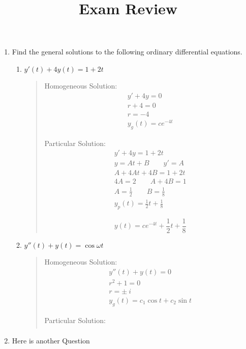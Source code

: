 \documentclass{article}
\title{Exam Review}
\date{}
\newcommand{\beq}{\begin{quote}}
\newcommand{\eeq}{\end{quote}}
\begin{document}
\maketitle
\begin{enumerate}
\item Find the general solutions to the following ordinary differential equations.
\begin{enumerate}
\item $y'(t) + 4y(t) = 1 + 2t$
\beq
\begin{minipage}[t]{0.4\textwidth}
Homogeneous Solution:
\begin{gather*}
y' + 4y = 0\\
r + 4 = 0\\
r = -4\\
y_{g}(t) = ce^{-4t}
\end{gather*}
\end{minipage}
\begin{minipage}[t]{0.4\textwidth}
Particular Solution:
\begin{gather*}
y' + 4y = 1 + 2t\\
y = At + B\qquad y'= A\\
A + 4At + 4B = 1 + 2t\\
4A = 2\qquad A + 4B = 1\\
A = \frac{1}{2}\qquad B = \frac{1}{8}\\
y_{p}(t) = \frac{1}{2}t + \frac{1}{8}
\end{gather*}
\end{minipage}
\[
y(t) = ce^{-4t} + \frac{1}{2}t + \frac{1}{8}
\]
\eeq
\item $y''(t) + y(t) = \cos{\omega t}$
\beq
\begin{minipage}[t]{0.4\textwidth}
Homogeneous Solution:
\begin{gather*}
y''(t) + y(t) = 0\\
r^{2} + 1 = 0\\
r = \pm\ i\\
y_{g}(t) = c_{1}\cos{t} + c_{2}\sin{t}
\end{gather*}
\end{minipage}
\begin{minipage}[t]{0.4\textwidth}
Particular Solution:
\begin{gather*}
\end{gather*}
\end{minipage}
\eeq
\end{enumerate}
\item Here is another Question

\end{enumerate}
\end{document}

